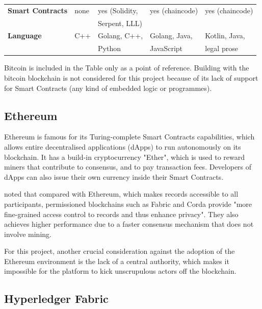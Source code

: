 \begin{table}[!ht]
\begin{tabularx}{\textwidth}{>{\bfseries}lXXXX}
		\midrule
		Smart Contracts & none                   & yes (Solidity,                    & yes (chaincode)               & yes (chaincode)       \\
		                &                        & Serpent, LLL)                                                                             \\
		\hline
		Language        & C++                    & Golang, C++,                      & Golang, Java,                 & Kotlin, Java,         \\
		                &                        & Python                            & JavaScript                    & legal prose           \\
		\bottomrule
	\end{tabularx}
\end{table}

Bitcoin is included in the Table only as a point of reference. Building with the bitcoin
blockchain is not considered for this project because of its lack of support for Smart
Contracts (any kind of embedded logic or programmes).

\subsection*{Ethereum}

Ethereum is famous for its Turing-complete Smart Contracts capabilities, which allows entire
decentralised applications (dApps) to run autonomously on its blockchain. It has a build-in cryptocurrency
"Ether", which is used to reward miners that contribute to consensus, and to pay transaction fees.
Developers of dApps can also issue their own currency inside their Smart Contracts.

\citet[p.3-4]{valenta2017comparison} noted that compared with Ethereum, which makes records accessible
to all participants, permissioned blockchains such as Fabric and Corda provide "more fine-grained access
control to records and thus enhance privacy".
They also achieves higher performance due to a faster consensus mechanism that does not involve mining.

For this project, another crucial consideration against the adoption of the Ethereum environment is the
lack of a central authority, which makes it impossible for the platform to kick unscrupulous actors off
the blockchain.

\subsection*{Hyperledger Fabric}

